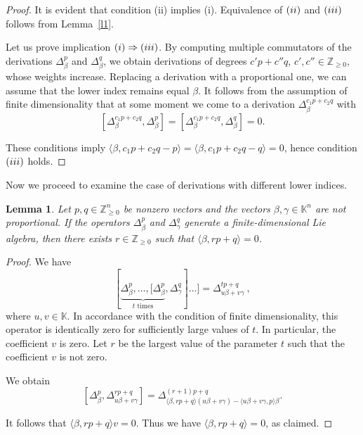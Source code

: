 \documentclass[a4paper, 12pt,oneside,reqno]{amsart}
\numberwithin{equation}{section}
\newtheorem{lemma}[theorem]{Lemma}
\theoremstyle{definition}
\begin{document}
\begin{proof}
It is evident that condition (ii) implies (i). Equivalence of ${\rm (ii)}$ and ${\rm (iii)}$ follows from Lemma~\ref{l1}. 

Let us prove implication ${\rm (i)}\Rightarrow {\rm (iii)}$. By computing multiple commutators of the derivations $\Delta^p_{\beta}$ and $\Delta^q_{\beta}$, we obtain derivations of degrees $c'p+c''q$, $c',c''\in\mathbb{Z}_{\ge 0}$, whose weights increase. Replacing a derivation with a proportional one, we can assume that the lower index remains equal $\beta$. It follows from the assumption of finite dimensionality that at some moment we come to a derivation $\Delta^{c_1p+c_2q}_{\beta}$ with
$$
[\Delta^{c_1p+c_2q}_{\beta},\Delta^p_{\beta}]=[\Delta^{c_1p+c_2q}_{\beta},\Delta^q_{\beta}]=0.
$$

These conditions imply $\langle\beta,c_1p+c_2q-p\rangle=\langle\beta,c_1p+c_2q-q\rangle=0$, hence condition ${\rm (iii)}$ holds.
\end{proof}

Now we proceed to examine the case of derivations with different lower indices.

\begin{lemma} \label{l3}
Let $p,q\in\mathbb{Z}^n_{\ge 0}$ be nonzero vectors and the vectors $\beta,\gamma\in\mathbb{K}^n$ are not proportional. If the operators $\Delta^p_{\beta}$ and $\Delta^q_{\gamma}$ generate a finite-dimensional Lie algebra, then there exists $r\in\mathbb{Z}_{\ge 0}$ such that $\langle\beta,rp+q\rangle=0$. 
\end{lemma}

\begin{proof}
We have
\[
 [\underbrace{ \Delta^p_{\beta},\ldots, [\Delta^p_{\beta}}_{\mbox{$t$ times}},\Delta^q_{\gamma}] \ldots] = \Delta^{tp+q}_{u\beta+v\gamma} \ ,
 \]
where $u,v\in\mathbb{K}$. In accordance with the condition of finite dimensionality, this operator is identically zero for sufficiently large values of $t$. In particular, the coefficient $v$ is zero. Let $r$ be the largest value of the parameter $t$ such that the coefficient $v$ is not zero.

We obtain
$$
[\Delta^p_{\beta},\Delta^{rp+q}_{u\beta+v\gamma}]=\Delta^{(r+1)p+q}_{\langle\beta,rp+q\rangle(u\beta+v\gamma)-\langle u\beta+v\gamma,p\rangle\beta}.
$$

It follows that $\langle\beta,rp+q\rangle v =0$. Thus we have $\langle\beta,rp+q\rangle =0$, as claimed.
\end{proof}
\end{document}
